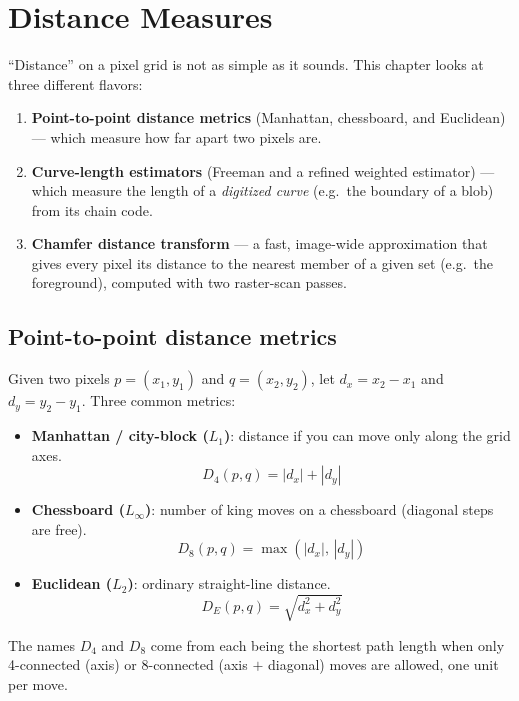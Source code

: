 \chapter{Distance Measures}
\label{ch:lesson07}

``Distance'' on a pixel grid is not as simple as it sounds. This chapter looks at three different flavors:
\begin{enumerate}
  \item \textbf{Point-to-point distance metrics} (Manhattan, chessboard, and Euclidean) --- which measure how far apart two pixels are.
  \item \textbf{Curve-length estimators} (Freeman and a refined weighted estimator) --- which measure the length of a \emph{digitized curve} (e.g.\ the boundary of a blob) from its chain code.
  \item \textbf{Chamfer distance transform} --- a fast, image-wide approximation that gives every pixel its distance to the nearest member of a given set (e.g.\ the foreground), computed with two raster-scan passes.
\end{enumerate}

\section{Point-to-point distance metrics}

Given two pixels $p=(x_1,y_1)$ and $q=(x_2,y_2)$, let $d_x=x_2-x_1$ and $d_y=y_2-y_1$. Three common metrics:
\begin{itemize}
  \item \textbf{Manhattan / city-block ($L_1$)}: distance if you can move only along the grid axes.
    \begin{equation}
    D_4(p,q) = |d_x| + |d_y|
    \end{equation}
  \item \textbf{Chessboard ($L_\infty$)}: number of king moves on a chessboard (diagonal steps are free).
    \begin{equation}
    D_8(p,q) = \max(|d_x|,\,|d_y|)
    \end{equation}
  \item \textbf{Euclidean ($L_2$)}: ordinary straight-line distance.
    \begin{equation}
    D_E(p,q) = \sqrt{d_x^2+d_y^2}
    \end{equation}
\end{itemize}
The names $D_4$ and $D_8$ come from each being the shortest path length when only 4-connected (axis) or 8-connected (axis $+$ diagonal) moves are allowed, one unit per move.

